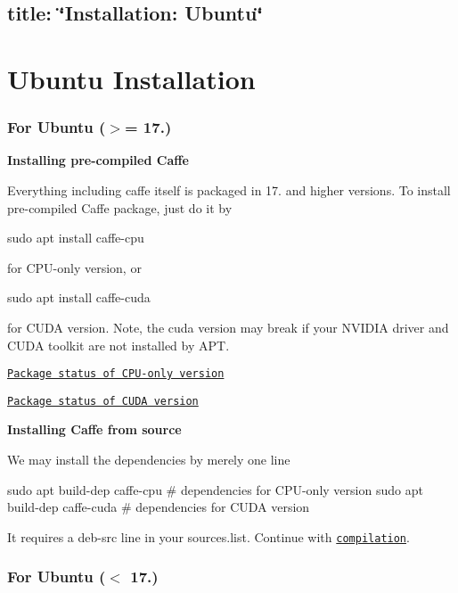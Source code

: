 

 \subsection*{title\+: \char`\"{}\+Installation\+: Ubuntu\char`\"{} }

\section*{Ubuntu Installation}

\subsubsection*{For Ubuntu ($>$= 17.)}

{\bfseries Installing pre-\/compiled Caffe}

Everything including caffe itself is packaged in 17. and higher versions. To install pre-\/compiled Caffe package, just do it by \begin{DoxyVerb}sudo apt install caffe-cpu
\end{DoxyVerb}


for C\+P\+U-\/only version, or \begin{DoxyVerb}sudo apt install caffe-cuda
\end{DoxyVerb}


for C\+U\+DA version. Note, the cuda version may break if your N\+V\+I\+D\+IA driver and C\+U\+DA toolkit are not installed by A\+PT.

\href{https://launchpad.net/ubuntu/+source/caffe}{\tt Package status of C\+P\+U-\/only version}

\href{https://launchpad.net/ubuntu/+source/caffe-contrib}{\tt Package status of C\+U\+DA version}

{\bfseries Installing Caffe from source}

We may install the dependencies by merely one line \begin{DoxyVerb}sudo apt build-dep caffe-cpu        # dependencies for CPU-only version
sudo apt build-dep caffe-cuda       # dependencies for CUDA version
\end{DoxyVerb}


It requires a {\ttfamily deb-\/src} line in your {\ttfamily sources.\+list}. Continue with \href{installation.html#compilation}{\tt compilation}.

\subsubsection*{For Ubuntu ($<$ 17.)}

